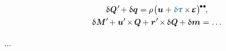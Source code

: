 \nopagebreak\vspace{-0.2em}\begin{gather*}
\variation{\hspace{.1ex}\internalforce}{\hspace{.25ex}'} \hspace{-0.3ex} + \variation{\bm{q}}
= \hspace{-0.1ex} \rho \hspace{.15ex} \bigl( \fieldofdisplacements + \varbivalent{\hspace{-0.2ex}\cauchystress} \hspace{-0.2ex} \times \hspace{-0.3ex} \infinitesimaldeformation \bigr)^{ \hspace{-0.1ex} \tikz[baseline=-0.2ex] \draw[black, fill=black] (0,0) circle (.28ex); \hspace{.25ex} \tikz[baseline=-0.2ex] \draw[black, fill=black] (0,0) circle (.28ex); }
\hspace{-0.2ex} ,
\\
%
\variation{\hspace{.1ex}\internalmoment}{\hspace{.25ex}'} \hspace{-0.3ex} + \fieldofdisplacements{'} \hspace{-0.3ex} \times \hspace{-0.2ex} \internalforce + \locationvector{\hspace{.1ex}'} \hspace{-0.3ex} \times \hspace{-0.2ex} \variation{\hspace{.1ex}\internalforce} + \variation{\internaldistributedmoment}
= \ldots
\end{gather*}

...




\label{para:rods.nonshearmodelwithextension}

